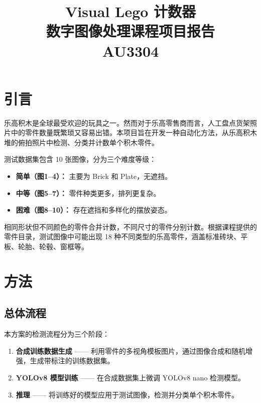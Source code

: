 \documentclass[12pt,a4paper]{ctexart}
\title{\textbf{Visual Lego 计数器}\\[6pt]
       \large 数字图像处理课程项目报告\\[4pt]
       \normalsize AU3304}
\author{}
\date{}
\begin{document}
\maketitle

\section{引言}

乐高积木是全球最受欢迎的玩具之一。然而对于乐高零售商而言，人工盘点货架照片中的零件数量既繁琐又容易出错。本项目旨在开发一种自动化方法，从乐高积木堆的俯拍照片中检测、分类并计数单个积木零件。

测试数据集包含 10 张图像，分为三个难度等级：

\begin{itemize}
    \item \textbf{简单（图1--4）：} 主要为 Brick 和 Plate，无遮挡。
    \item \textbf{中等（图5--7）：} 零件种类更多，排列更复杂。
    \item \textbf{困难（图8--10）：} 存在遮挡和多样化的摆放姿态。
\end{itemize}

相同形状但不同颜色的零件合并计数，不同尺寸的零件分别计数。根据课程提供的零件目录，测试图像中可能出现 18 种不同类型的乐高零件，涵盖标准砖块、平板、轮胎、轮毂、窗框等。

\section{方法}

\subsection{总体流程}

本方案的检测流程分为三个阶段：

\begin{enumerate}
    \item \textbf{合成训练数据生成} —— 利用零件的多视角模板图片，通过图像合成和随机增强，生成带标注的训练数据集。
    \item \textbf{YOLOv8 模型训练} —— 在合成数据集上微调 YOLOv8 nano 检测模型。
    \item \textbf{推理} —— 将训练好的模型应用于测试图像，检测并分类单个积木零件。
\end{enumerate}
\end{document}
